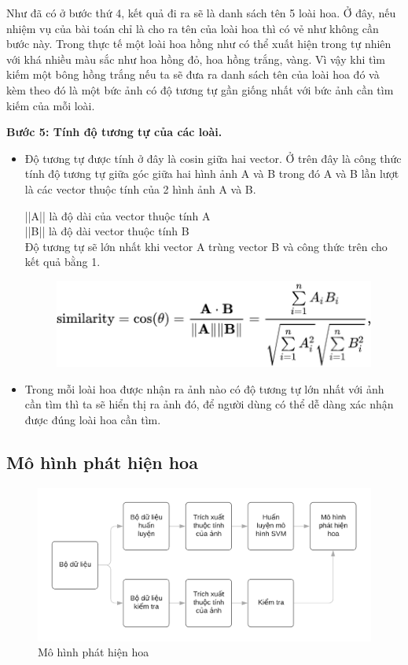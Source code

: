 \documentclass[12pt]{report}
\begin{document}
		Như đã có ở bước thứ 4, kết quả đi ra sẽ là danh sách tên 5 loài hoa. Ở đây, nếu nhiệm vụ của bài toán chỉ là cho ra tên của loài hoa thì có vẻ như không cần bước này. Trong thực tế một loài hoa hồng như có thể xuất hiện trong tự nhiên với khá nhiều màu sắc như hoa hồng đỏ, hoa hồng trắng, vàng. Vì vậy khi tìm kiếm một bông hồng trắng nếu ta sẽ đưa ra danh sách tên của loài hoa đó và kèm theo đó là một bức ảnh có độ tương tự gần giống nhất với bức ảnh cần tìm kiếm của mỗi loài.
								
		\textbf{Bước 5: Tính độ tương tự của các loài.} 
		\begin{itemize}
			\item Độ tương tự được tính ở đây là cosin giữa hai vector.
			      Ở trên đây là công thức tính độ tương tự giữa góc giữa hai hình ảnh A và B trong đó A và B lần lượt là các vector thuộc tính của 2 hình ảnh A và B. 
			      			      			      			
			      ||A|| là độ dài của vector thuộc tính A\\
			      ||B|| là độ dài vector thuộc tính B\\
			      Độ tương tự sẽ lớn nhất khi vector A trùng vector B và công thức trên cho kết quả bằng 1.
			      \begin{figure}[h]
			      	\centering
			      	\includegraphics[scale=0.8]{cosin}
			      \end{figure}
			\item Trong mỗi loài hoa được nhận ra ảnh nào có độ tương tự lớn nhất với ảnh cần tìm thì ta sẽ hiển thị ra ảnh đó, để người dùng có thể dễ dàng xác nhận được đúng loài hoa cần tìm.
		\end{itemize}	
										
		\subsection{Mô hình phát hiện hoa}
		\begin{figure}[h]
			\centering
			\includegraphics[scale=0.4]{mohinh_phathien}
			\caption{Mô hình phát hiện hoa}
			\label{fig:mohinh_phathien}
		\end{figure}
						
\end{document}
